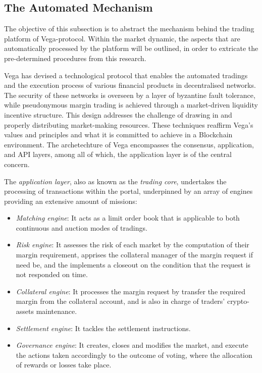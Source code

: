 \documentclass[11pt,twoside]{article}
\numberwithin{Theorem}{section}
\numberwithin{Definition}{section}
\numberwithin{Lemma}{section}
\numberwithin{Algorithm}{section}
\numberwithin{equation}{section}
\begin{document}
\subsection{The Automated Mechanism}\label{Chap: Auto}
The objective of this subsection is to abstract the mechanism behind the trading platform of Vega-protocol. Within the market dynamic, the aspects that are automatically processed by the platform will be outlined, in order to extricate the pre-determined procedures from this research. 

Vega has devised a technological protocol that enables the automated tradings and the execution process of various financial products in decentralised networks. The security of these networks is overseen by a layer of byzantine fault tolerance, while pseudonymous margin trading is achieved through a market-driven liquidity incentive structure. This design addresses the challenge of drawing in and properly distributing market-making resources. These techniques reaffirm Vega's values and principles and what it is committed to achieve in a Blockchain environment. The archetechture of Vega encompasses the consensus, application, and API layers, among all of which, the application layer is of the central concern. 

The \emph{application layer}, also as known as the \emph{trading core}, undertakes the processing of transactions within the portal, underpinned by an array of engines providing an extensive amount of missions:
\begin{itemize}
    \item \emph{Matching engine}: It acts as a limit order book that is applicable to both continuous and auction modes of tradings.
    \item \emph{Risk engine}: It assesses the risk of each market by the computation of their margin requirement, apprises the collateral manager of the margin request if need be, and the implements a closeout on the condition that the request is not responded on time.
    \item \emph{Collateral engine}: It processes the margin request by transfer the required margin from the collateral account, and is also in charge of traders' crypto-assets maintenance.
    \item \emph{Settlement engine}: It tackles the settlement instructions.
    \item \emph{Governance engine}: It creates, closes and modifies the market, and execute the actions taken accordingly to the outcome of voting, where the allocation of rewards or losses take place.
\end{itemize}
\end{document}
